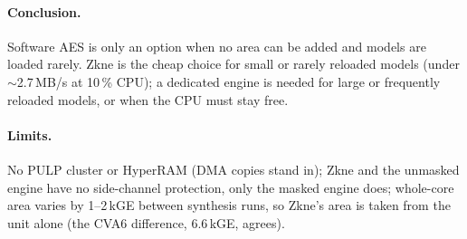 \documentclass[10pt]{article}
\begin{document}
\paragraph{Conclusion.} Software AES is only an option when no area can be added and models are loaded rarely.
Zkne is the cheap choice for small or rarely reloaded models (under $\sim$2.7\,MB/s at 10\,\% CPU);
a dedicated engine is needed for large or frequently reloaded models, or when the CPU must stay free.

\paragraph{Limits.} No PULP cluster or HyperRAM (DMA copies stand in); Zkne and the unmasked engine have no side-channel
protection, only the masked engine does; whole-core area varies by 1--2\,kGE between synthesis runs, so Zkne's area is
taken from the unit alone (the CVA6 difference, 6.6\,kGE, agrees).
\end{document}
